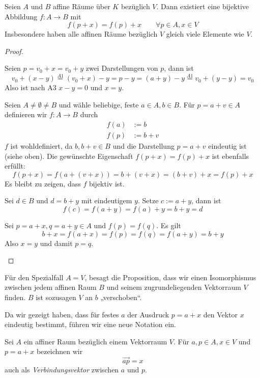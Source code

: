 \documentclass{mycourse}
\begin{document}
\begin{prop} 
	\label{prop:8.4}
Seien $A$ und $B$ affine Räume über $K$ bezüglich $V$.
Dann existiert eine bijektive Abbildung $f:A\rightarrow B$ mit 
\[
	f(p+x) = f(p)+x \qquad \forall p\in A, x\in V
\]
Insbesondere haben alle affinen Räume bezüglich $V$ gleich viele Elemente wie $V$.
\begin{proof}
	\begin{seg}[Eindeutige Darstellung von $p=v_0+x$]
		Seien $p=v_0+x=v_0+y$ zwei Darstellungen von $p$, dann ist
		\[
			v_0+(x-y) \stackrel{A1}= (v_0+x)-y = p-y = (a+y)-y \stackrel{A1}= v_0+(y-y) = v_0
		\]
		Also ist nach A3 $x-y=0$ und $x=y$.
	\end{seg}
	Seien $A\neq \emptyset \neq B$ und wähle beliebige, feste $a\in A, b\in B$.
	Für $p=a+v\in A$ definieren wir $f:A\to B$ durch
	\begin{align*}
		f(a) &:= b\\
		f(p) &:= b +v
	\end{align*}
	$f$ ist wohldefiniert, da $b,b+v\in B$ und die Darstellung $p=a+v$ eindeutig ist (siehe oben).
	Die gewünschte Eigenschaft $f(p+x)=f(p)+x$ ist ebenfalls erfüllt:
	\[
		f(p+x) = f(a+(v+x)) = b + (v+x) = (b+v)+x = f(p) + x
	\]
	Es bleibt zu zeigen, dass $f$ bijektiv ist.

	\begin{seg}[$f$ surjektiv]
		Sei $d\in B$ und $d=b+y$ mit eindeutigem $y$.
		Setze $c := a+y$, dann ist
		\[
			f(c) = f(a+y) = f(a)+y = b+y = d
		\]
	\end{seg}
	\begin{seg}[$f$ injektiv]
		Sei $p=a+x,q=a+y\in A$ und $f(p)=f(q)$.
		Es gilt
		\[
			b + x = f(a+x) = f(p) = f(q) = f(a+y) = b+y
		\]
		Also $x=y$ und damit $p=q$.
	\end{seg}
\end{proof}
\begin{note}
	Für den Spezialfall $A=V$, besagt die Proposition, dass wir einen Isomorphismus zwischen jedem affinen Raum $B$ und seinem zugrundeliegenden Vektorraum $V$ finden.
	$B$ ist sozusagen $V$ an $b$ „verschoben“.
\end{note}
\end{prop}

Da wir gezeigt haben, dass für festes $a$ der Ausdruck $p=a+x$ den Vektor $x$ eindeutig bestimmt, führen wir eine neue Notation ein.

\begin{df*}
	Sei $A$ ein affiner Raum bezüglich einem Vektorraum $V$.
	Für $a,p\in A, x\in V$ und $p=a+x$ bezeichnen wir
	\[
		\vec{ap} = x
	\]
	auch als \emph{Verbindungsvektor} zwischen $a$ und $p$.
\end{df*}
\end{document}
